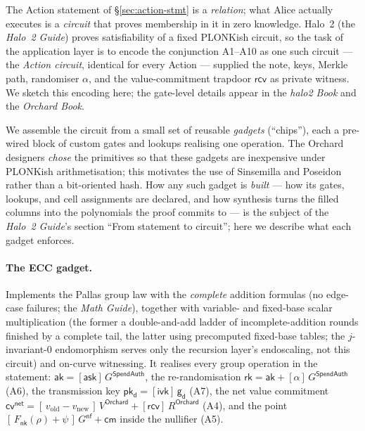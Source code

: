 \documentclass[11pt,a4paper]{article}
\theoremstyle{definition}
\newcommand{\cmsym}{\mathsf{cm}}
\newcommand{\cvsym}{\mathsf{cv}}
\newcommand{\rk}{\mathsf{rk}}
\newcommand{\ask}{\ensuremath{\mathsf{ask}}}
\newcommand{\aksym}{\ensuremath{\mathsf{ak}}}
\newcommand{\nksym}{\ensuremath{\mathsf{nk}}}
\newcommand{\ivk}{\ensuremath{\mathsf{ivk}}}
\newcommand{\pkd}{\ensuremath{\mathsf{pk_d}}}
\newcommand{\gd}{\ensuremath{\mathsf{g_d}}}
\newcommand{\rcv}{\ensuremath{\mathsf{rcv}}}
\begin{document}
The Action statement of \S\ref{sec:action-stmt} is a \emph{relation}; what Alice
actually executes is a \emph{circuit} that proves membership in it in zero
knowledge. Halo~2 (the \emph{Halo~2 Guide}) proves satisfiability of a fixed
PLONKish circuit, so the task of the application layer is to encode the
conjunction A1--A10 as one such circuit --- the \emph{Action circuit}, identical
for every Action --- supplied the note, keys, Merkle path, randomiser $\alpha$, and the
value-commitment trapdoor $\rcv$ as private witness. We sketch this encoding here; the gate-level
details appear in the \emph{halo2 Book} and the \emph{Orchard Book}.

We assemble the circuit from a small set of reusable \emph{gadgets} (``chips''),
each a pre-wired block of custom gates and lookups realising one operation. The
Orchard designers \emph{chose} the primitives so that these gadgets are inexpensive under
PLONKish arithmetisation; this motivates the use of Sinsemilla and Poseidon
rather than a bit-oriented hash. How any such gadget is \emph{built} --- how
its gates, lookups, and cell assignments are declared, and how synthesis
turns the filled columns into the polynomials the proof commits to --- is
the subject of the \emph{Halo~2 Guide}'s section ``From statement to
circuit''; here we describe what each gadget enforces.

\paragraph{The ECC gadget.} Implements the Pallas group law with the
\emph{complete} addition formulas (no edge-case failures; the
\emph{Math Guide}), together with variable- and fixed-base scalar
multiplication (the former a double-and-add ladder of incomplete-addition
rounds finished by a complete tail, the latter using precomputed fixed-base
tables; the $j$-invariant-$0$ endomorphism serves only the recursion layer's
endoscaling, not this circuit) and
on-curve witnessing. It realises every group operation in the statement:
$\aksym = [\ask]\,G^{\mathsf{SpendAuth}}$, the re-randomisation
$\rk = \aksym + [\alpha]\,G^{\mathsf{SpendAuth}}$ (A6), the transmission key
$\pkd = [\ivk]\,\gd$ (A7), the net value commitment
$\cvsym^{\mathsf{net}} = [\,v_{\mathrm{old}}-v_{\mathrm{new}}\,]\,V^{\mathsf{Orchard}} + [\rcv]\,R^{\mathsf{Orchard}}$
(A4), and the point $[\,F_{\nksym}(\rho)+\psi\,]\,G^{\mathsf{nf}} + \cmsym$ inside
the nullifier (A5).
\end{document}
